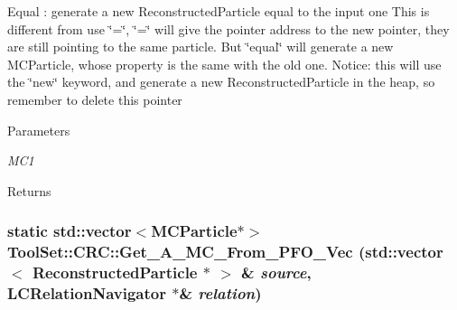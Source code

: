 Equal : generate a new ReconstructedParticle equal to the input one This is different from use \char`\"{}=\char`\"{}, \char`\"{}=\char`\"{} will give the pointer address to the new pointer, they are still pointing to the same particle. But \char`\"{}equal\char`\"{} will generate a new MCParticle, whose property is the same with the old one. Notice: this will use the \char`\"{}new\char`\"{} keyword, and generate a new ReconstructedParticle in the heap, so remember to delete this pointer


\begin{DoxyParams}{Parameters}
\item[{\em MC1}]\end{DoxyParams}
\begin{DoxyReturn}{Returns}

\end{DoxyReturn}
\hypertarget{classToolSet_1_1CRC_acab3f644700643fa2b2967365748d0df}{
\subsubsection[{Get\_\-A\_\-MC\_\-From\_\-PFO\_\-Vec}]{\setlength{\rightskip}{0pt plus 5cm}static std::vector$<$MCParticle$\ast$$>$ ToolSet::CRC::Get\_\-A\_\-MC\_\-From\_\-PFO\_\-Vec (std::vector$<$ ReconstructedParticle $\ast$ $>$ \& {\em source}, \/  LCRelationNavigator $\ast$\& {\em relation})}}
\label{classToolSet_1_1CRC_acab3f644700643fa2b2967365748d0df}


